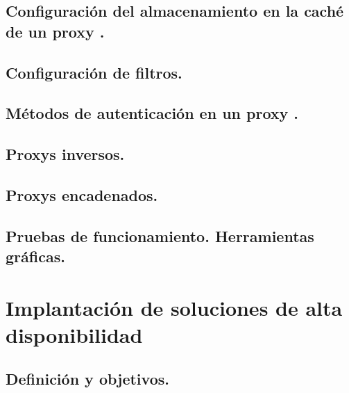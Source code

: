 \documentclass[letterpaper,10pt,spanish]{sphinxmanual}
\begin{document}
\section{Configuración del almacenamiento en la caché de un  proxy .}
\label{\detokenize{tema_proxys/tema_proxys:configuracion-del-almacenamiento-en-la-cache-de-un-proxy}}

\section{Configuración de filtros.}
\label{\detokenize{tema_proxys/tema_proxys:configuracion-de-filtros}}

\section{Métodos de autenticación en un  proxy .}
\label{\detokenize{tema_proxys/tema_proxys:metodos-de-autenticacion-en-un-proxy}}

\section{Proxys  inversos.}
\label{\detokenize{tema_proxys/tema_proxys:proxys-inversos}}

\section{Proxys  encadenados.}
\label{\detokenize{tema_proxys/tema_proxys:proxys-encadenados}}

\section{Pruebas de funcionamiento. Herramientas gráficas.}
\label{\detokenize{tema_proxys/tema_proxys:pruebas-de-funcionamiento-herramientas-graficas}}

\chapter{Implantación de soluciones de alta disponibilidad}
\label{\detokenize{tema_sad/tema_sad:implantacion-de-soluciones-de-alta-disponibilidad}}\label{\detokenize{tema_sad/tema_sad::doc}}

\section{Definición y objetivos.}
\label{\detokenize{tema_sad/tema_sad:definicion-y-objetivos}}
\end{document}
